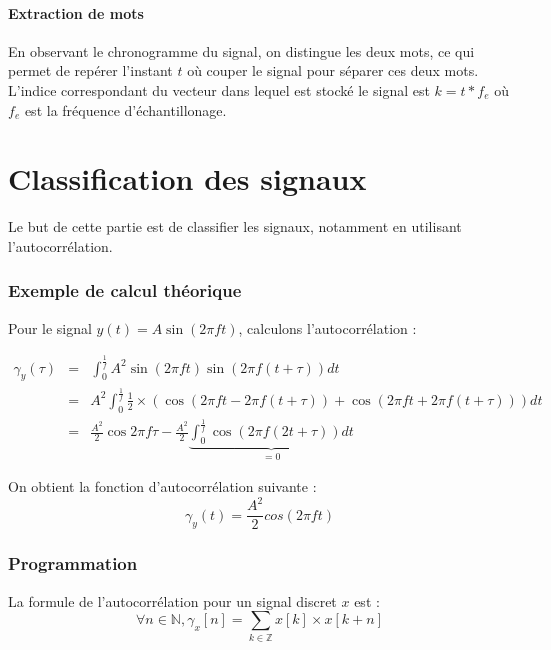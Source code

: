 \documentclass[french]{article}
\begin{document}
\subsection{Extraction de mots}

En observant le chronogramme du signal, on distingue les deux mots, ce qui permet de repérer l'instant $t$ où couper le signal pour séparer ces deux mots. L'indice correspondant du vecteur dans lequel est stocké le signal est $k=t*f_e$ où $f_e$ est la fréquence d'échantillonage.

\FloatBarrier
\newpage
\clearpage
\part{ Classification des signaux}

Le but de cette partie est de classifier les signaux, notamment en utilisant l'autocorrélation.

\section{ Exemple de calcul théorique}

Pour le signal $y(t) = A \sin(2 \pi f t)$, calculons l'autocorrélation :

\begin{eqnarray}
\gamma_y(\tau) &=& \int_0^{\frac{1}{f}} A^2 \sin(2\pi f t) \sin(2 \pi f (t+\tau)) dt \\
&=& A^2 \int^{\frac{1}{f}}_0 \frac{1}{2} \times (\cos(2\pi f t - 2 \pi f (t+\tau)) + \cos(2\pi f t + 2 \pi f (t + \tau))) dt \\
&=& \frac{A^2}{2} \cos 2\pi f \tau - \frac{A^2}{2}\underbrace{\int_0^{\frac{1}{f}} \cos (2 \pi f (2t + \tau)) dt}_{=0}
\end{eqnarray}

On obtient la fonction d'autocorrélation suivante :
\begin{equation}
\gamma_y (t) = \frac{A^2} {2} cos(2 \pi f t)
\end{equation}

\section{ Programmation}

La formule de l'autocorrélation pour un signal discret $x$ est :
\begin{equation}
\forall n \in \mathbb{N}, \gamma_x [n] = \sum_{k\in \mathbb{Z}} x[k] \times x[k+n]
\end{equation}
\end{document}
